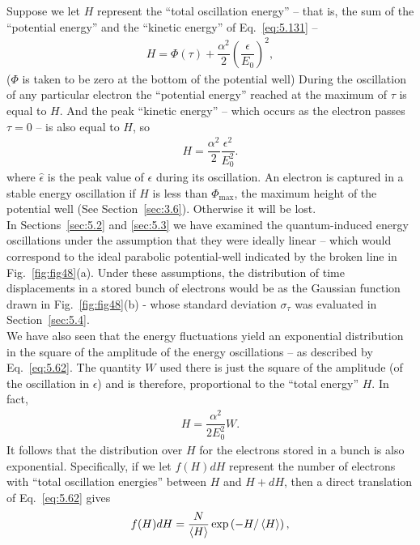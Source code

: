 Suppose we let $H$ represent the ``total oscillation energy'' -- that is, the sum of the ``potential
 energy'' and the ``kinetic energy'' of Eq.~\eqref{eq:5.131} --
\begin{align}
	H = \Phi(\tau) + \dfrac{\alpha^2}{2} \left( \dfrac{\epsilon}{E_0} \right)^2,
\end{align}
($\Phi$ is taken to be zero at the bottom of the potential well) During the oscillation of any particular electron the ``potential energy'' reached at the maximum of $\tau$ is equal to $H$. And the peak ``kinetic energy'' -- which occurs as the electron passes $\tau = 0$ -- is also equal to %
$H$, so
\begin{align}
	H = \dfrac{\alpha^2}{2} \dfrac{\epsilon^2}{E_0^2}.
\end{align}
where $\hat{\epsilon}$ is the peak value of $\epsilon$ during its oscillation. An electron is captured in a stable energy oscillation if $H$ is less than $\Phi_\text{max}$, the maximum height of the potential well (See Section~\ref{sec:3.6}). Otherwise it will be lost.\\
In Sections~\ref{sec:5.2} and \ref{sec:5.3} we have examined the quantum-induced energy oscillations under the assumption that they were ideally linear -- which would correspond to the ideal parabolic potential-well indicated by the broken line in Fig.~\ref{fig:fig48}(a). Under these assumptions, the distribution of time displacements in a stored bunch of electrons would be as the Gaussian function drawn in Fig.~\ref{fig:fig48}(b) - whose standard deviation $\sigma_\tau$ was evaluated in Section~\ref{sec:5.4}.\\
We have also seen that the energy fluctuations yield an exponential distribution in the square of the amplitude of the energy oscillations -- as described by Eq.~\eqref{eq:5.62}. The quantity $W$ used there is just the square of the amplitude (of the oscillation in $\epsilon$) and is therefore, proportional to the ``total energy'' $H$. In fact,
\begin{align}
	H = \dfrac{\alpha^2}{2 E_0^2}W.
\end{align}
It follows that the distribution over $H$ for the electrons stored in a bunch is also exponential. Specifically, if we let $f(H)dH$ represent the number of electrons with ``total oscillation energies'' between $H$ and $H + dH$, then a direct translation of Eq.~\eqref{eq:5.62} gives
\begin{align}
	f(H)dH = \dfrac{N}{\left< H \right>} \exp \left( -H/\left< H \right> \right),
\end{align}
